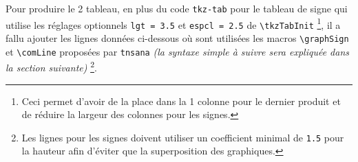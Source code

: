 \documentclass[12pt,a4paper]{article}
\newcommand\env[1]{\texttt{#1}}
\newcommand\macro[1]{\env{\textbackslash{}#1}}
\theoremstyle{definition}
\begin{document}
\begin{center}
\end{center}


Pour produire le 2\ieme{} tableau, en plus du code \verb#tkz-tab# pour le tableau de signe qui utilise les réglages optionnels \verb#lgt = 3.5# et 
\verb#espcl = 2.5# de \macro{tkzTabInit}
\footnote{
	Ceci permet d'avoir de la place dans la 1\iere{} colonne pour le dernier produit et de réduire la largeur des colonnes pour les signes.
},
il a fallu ajouter les lignes données ci-dessous où sont utilisées les macros \macro{graphSign} et \macro{comLine} proposées par \verb+tnsana+ \emph{(la syntaxe simple à suivre sera expliquée dans la section suivante)}
\footnote{
	Les lignes pour les signes doivent utiliser un coefficient minimal de \texttt{1.5} pour la hauteur afin d'éviter que la superposition des graphiques.
}.

\medskip

\begin{latexex-alone}
\end{latexex-alone}
\end{document}
